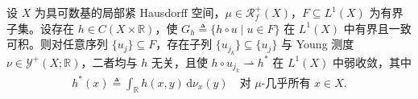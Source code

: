 \documentclass[../../main.tex]{subfiles}
\begin{document}
\begin{proposition}\label{proposition:ch05-弱收敛}\label{proposition:ch05-biting}\label{proposition:ch05-5.4.10}
设 $X$ 为具可数基的局部紧 Hausdorff 空间，$\mu\in\mathscr{R}^+_f(X)$，$F\subseteq L^1(X)$ 为有界子集。设存在 $h\in C(X\times\mathbb{R})$，使 $G_h\triangleq\{h\circ u\mid u\in F\}$ 在 $L^1(X)$ 中有界且一致可积。则对任意序列 $\{u_j\}\subseteq F$，存在子列 $\{u_{j_k}\}\subseteq\{u_j\}$ 与 Young 测度 $\nu\in\mathcal{Y}^+(X;\mathbb{R})$，二者均与 $h$ 无关，且使 $h\circ u_{j_k}\rightharpoonup h^*$ 在 $L^1(X)$ 中弱收敛，其中
\begin{align}
h^*(x)\triangleq\int_{\mathbb{R}}h(x,y)\,\mathrm{d}\nu_x(y)
\quad\text{对 }\mu\text{-几乎所有 }x\in X.\label{align:ch05-5.81}
\end{align}
\end{proposition}
\end{document}
